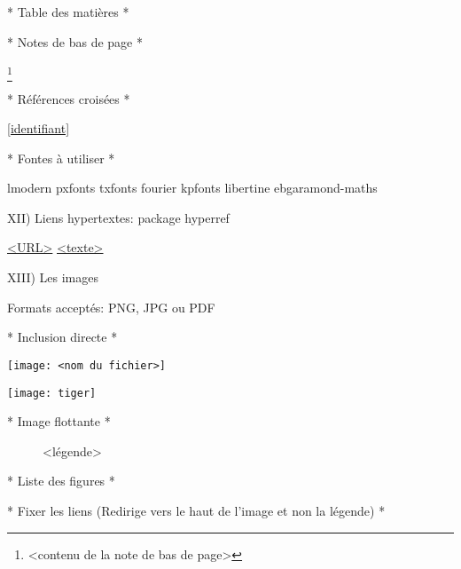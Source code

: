 * Table des matières *

\tableofcontents

* Notes de bas de page *

\footnote{<contenu de la note de bas de page>}

* Références croisées *

\label{identifiant} 

\ref{identifiant} %
\pageref{identifiant} %

* Fontes à utiliser *

lmodern %
pxfonts %
txfonts %
fourier %
kpfonts %
libertine %
ebgaramond-maths %

XII) Liens hypertextes: package hyperref
\usepackage{hyperref} %



\url{<URL>} %
\href{<URL>}{<texte>} %

XIII) Les images

Formats acceptés: PNG, JPG ou PDF

* Inclusion directe *
\usepackage{graphicx}

\texttt{[image: <nom du fichier>]} %

\texttt{[image: tiger]}\hfill %

* Image flottante *


\begin{figure}[<placement>] %
	\centering
	\caption{<légende>}
	\label{<identifiant>}
\end{figure}

* Liste des figures *

\listoffigures

* Fixer les liens (Redirige vers le haut de l'image et non la légende) *

\usepackage{graphicx}
\usepackage{hyperref}
\usepackage[all]{hypcap} %

